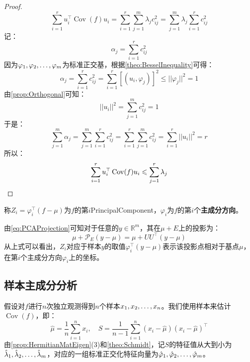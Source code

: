 \begin{proof}
\begin{equation*}
		\sum_{i=1}^{r}u_i^{\top}\operatorname{Cov}(f)u_i=\sum_{i=1}^{r}\sum_{j=1}^{m}\lambda_jc_{ij}^2=\sum_{j=1}^{m}\lambda_j\sum_{i=1}^{r}c_{ij}^2
	\end{equation*}
	记：
	\begin{equation*}
		\alpha_j=\sum_{i=1}^{r}c_{ij}^2
	\end{equation*}
	因为$\varphi_1, \varphi_2, \dots, \varphi_{m}$为标准正交基，根据\cref{theo:BesselInequality}可得：
	\begin{equation*}
		\alpha_j=\sum_{i=1}^{r}c_{ij}^2=\sum_{i=1}^{r}[(u_i,\varphi_j)]^2\leqslant||\varphi_j||^2=1
	\end{equation*}
	由\cref{prop:Orthogonal}可知：
	\begin{equation*}
		||u_i||^2=\sum_{j=1}^{m}c_{ij}^2=1
	\end{equation*}
	于是：
	\begin{equation*}
		\sum_{j=1}^{m}\alpha_j=\sum_{j=1}^{m}\sum_{i=1}^{r}c_{ij}^2=\sum_{i=1}^{r}\sum_{j=1}^{m}c_{ij}^2=\sum_{i=1}^{r}||u_i||^2=r
	\end{equation*}
	所以：
	\begin{equation*}
		\sum_{i=1}^{r}u_i^{\top}\operatorname{Cov}(f)u_i\leqslant\sum_{j=1}^{r}\lambda_j\qedhere
	\end{equation*}
\end{proof}
\begin{definition}
	称$Z_i=\varphi_i^{\top}(f-\mu)$为$f$的第$i$\gls{PrincipalComponent}，$\varphi_i$为$f$的第$i$个\textbf{主成分方向}。
\end{definition}
\begin{note}
	由\cref{eq:PCAProjection}可知对于任意的$y\in\mathbb{R}^{m}$，其在$\mu+E$上的投影为：
	\begin{equation*}
		\mu+\mathcal{P}_E(y-\mu)=\mu+UU^{\top}(y-\mu)
	\end{equation*}
	从上式可以看出，$Z_i$对应于样本$y$的取值$\varphi_i^{\top}(y-\mu)$表示该投影点相对于基点$\mu$，在第$i$个主成分方向$\varphi_i$上的坐标。
\end{note}

\subsection{样本主成分分析}
假设对$f$进行$n$次独立观测得到$n$个样本$x_1, x_2, \dots, x_{n}$。我们使用样本来估计$\operatorname{Cov}(f)$，即：
\begin{equation*}
	\hat{\mu}=\frac{1}{n}\sum_{i=1}^{n}x_i,\quad S=\frac{1}{n-1}\sum_{i=1}^{n}(x_i-\hat{\mu})(x_i-\hat{\mu})^{\top}
\end{equation*}
由\cref{prop:HermitianMatEigen}(3)和\cref{theo:Schmidt}，记$S$的特征值从大到小为$\hat{\lambda}_1, \hat{\lambda}_2, \dots, \hat{\lambda}_{m}$，对应的一组标准正交化特征向量为$\hat{\varphi}_1, \hat{\varphi}_2, \dots, \hat{\varphi}_{m}$。\par

